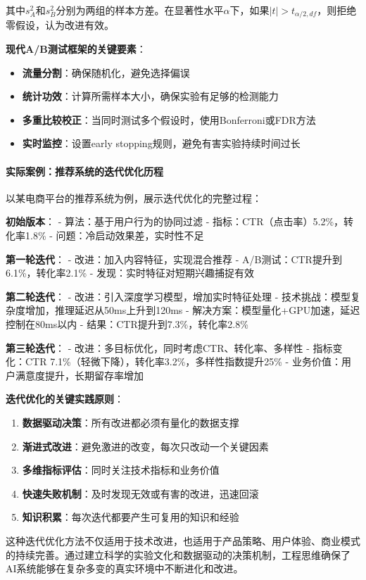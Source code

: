 其中$s_A^2$和$s_B^2$分别为两组的样本方差。在显著性水平$\alpha$下，如果$|t| > t_{\alpha/2, df}$，则拒绝零假设，认为改进有效。

\textbf{现代A/B测试框架的关键要素}：
\begin{itemize}
\item \textbf{流量分割}：确保随机化，避免选择偏误
\item \textbf{统计功效}：计算所需样本大小，确保实验有足够的检测能力
\item \textbf{多重比较校正}：当同时测试多个假设时，使用Bonferroni或FDR方法
\item \textbf{实时监控}：设置early stopping规则，避免有害实验持续时间过长
\end{itemize}

\paragraph{实际案例：推荐系统的迭代优化历程}
以某电商平台的推荐系统为例，展示迭代优化的完整过程：

\textbf{初始版本}：
- 算法：基于用户行为的协同过滤
- 指标：CTR（点击率）5.2\%，转化率1.8\%
- 问题：冷启动效果差，实时性不足

\textbf{第一轮迭代}：
- 改进：加入内容特征，实现混合推荐
- A/B测试：CTR提升到6.1\%，转化率2.1\%
- 发现：实时特征对短期兴趣捕捉有效

\textbf{第二轮迭代}：
- 改进：引入深度学习模型，增加实时特征处理
- 技术挑战：模型复杂度增加，推理延迟从50ms上升到120ms
- 解决方案：模型量化+GPU加速，延迟控制在80ms以内
- 结果：CTR提升到7.3\%，转化率2.8\%

\textbf{第三轮迭代}：
- 改进：多目标优化，同时考虑CTR、转化率、多样性
- 指标变化：CTR 7.1\%（轻微下降），转化率3.2\%，多样性指数提升25\%
- 业务价值：用户满意度提升，长期留存率增加

\textbf{迭代优化的关键实践原则}：
\begin{enumerate}
\item \textbf{数据驱动决策}：所有改进都必须有量化的数据支撑
\item \textbf{渐进式改进}：避免激进的改变，每次只改动一个关键因素
\item \textbf{多维指标评估}：同时关注技术指标和业务价值
\item \textbf{快速失败机制}：及时发现无效或有害的改进，迅速回滚
\item \textbf{知识积累}：每次迭代都要产生可复用的知识和经验
\end{enumerate}

这种迭代优化方法不仅适用于技术改进，也适用于产品策略、用户体验、商业模式的持续完善。通过建立科学的实验文化和数据驱动的决策机制，工程思维确保了AI系统能够在复杂多变的真实环境中不断进化和改进。

